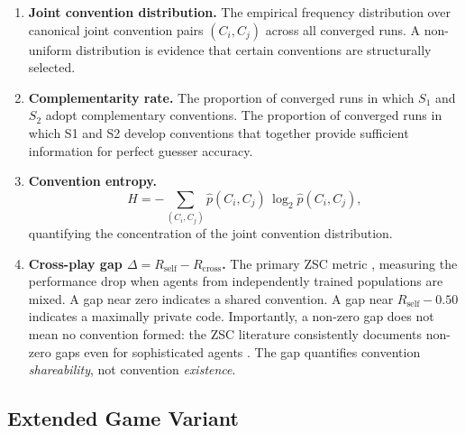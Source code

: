 \documentclass[a4paper,twoside,12pt]{report}
\begin{document}
    \begin{enumerate}[resume]
        \item \textbf{Joint convention distribution.} The empirical frequency
        distribution over canonical joint convention pairs $(C_i, C_j)$ across
        all converged runs. A non-uniform distribution is evidence
        that certain conventions are structurally selected.
    
        \item \textbf{Complementarity rate.} The proportion of converged runs
        in which $S_1$ and $S_2$ adopt complementary conventions. The proportion of converged runs in which S1 and S2 develop conventions that together provide sufficient information for perfect guesser accuracy.
    
        \item \textbf{Convention entropy.}
        \begin{equation}
            H = -\sum_{(C_i, C_j)} \hat{p}(C_i, C_j)\,\log_2 \hat{p}(C_i, C_j),
        \end{equation}
        quantifying the concentration of the joint convention distribution.
    
        
        \item \textbf{Cross-play gap $\Delta = R_{\mathrm{self}} -
        R_{\mathrm{cross}}$.} The primary ZSC metric \citep{hu2021obl}, measuring the performance drop
        when agents from independently trained populations are mixed.
        A gap near zero indicates a shared convention. A gap near
        $R_{\mathrm{self}} - 0.50$ indicates a maximally private code.
        Importantly, a non-zero gap does not mean no convention formed:
        the ZSC literature consistently documents non-zero gaps even for
        sophisticated agents \citep{hu2021obl}. The gap quantifies
        convention \emph{shareability}, not convention \emph{existence}.
    \end{enumerate}
    
    
    
    \subsection{Extended Game Variant}
    \label{sec:extended-game}
    
\end{document}
